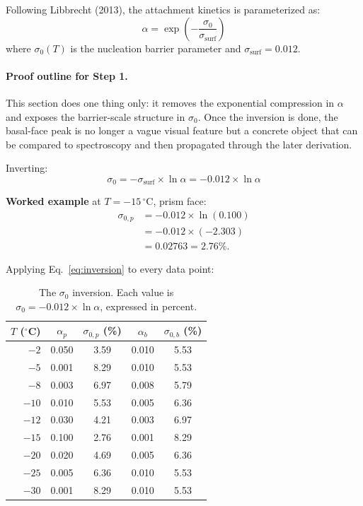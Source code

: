 \documentclass[12pt,letterpaper]{article}
\begin{document}
Following Libbrecht (2013), the attachment kinetics is parameterized as:
\begin{equation}
\alpha = \exp\!\left(-\frac{\sigma_0}{\sigma_{\mathrm{surf}}}\right)
\label{eq:alpha}
\end{equation}
where $\sigma_0(T)$ is the nucleation barrier parameter and $\sigma_{\mathrm{surf}} = 0.012$.

\paragraph{Proof outline for Step 1.}
This section does one thing only: it removes the exponential compression in $\alpha$ and exposes the barrier-scale structure in $\sigma_0$.
Once the inversion is done, the basal-face peak is no longer a vague visual feature but a concrete object that can be compared to spectroscopy and then propagated through the later derivation.

Inverting:
\begin{equation}
\boxed{\sigma_0 = -\sigma_{\mathrm{surf}} \times \ln \alpha = -0.012 \times \ln \alpha}
\label{eq:inversion}
\end{equation}

\textbf{Worked example} at $T = -15\,{}^\circ$C, prism face:
\begin{align}
\sigma_{0,p} &= -0.012 \times \ln(0.100) \\
&= -0.012 \times (-2.303) \\
&= 0.02763 = 2.76\%.
\end{align}

Applying Eq.~\eqref{eq:inversion} to every data point:

\begin{table}[H]
\centering
\caption{The $\sigma_0$ inversion.  Each value is $\sigma_0 = -0.012 \times \ln\alpha$, expressed in percent.}
\label{tab:sigma0}
\begin{tabular}{@{}rcccc@{}}
\toprule
$T$ (${}^\circ$C) & $\alpha_p$ & $\sigma_{0,p}$ (\%) & $\alpha_b$ & $\sigma_{0,b}$ (\%) \\
\midrule
$-2$  & 0.050 & 3.59 & 0.010 & 5.53 \\
$-5$  & 0.001 & 8.29 & 0.010 & 5.53 \\
$-8$  & 0.003 & 6.97 & 0.008 & 5.79 \\
$-10$ & 0.010 & 5.53 & 0.005 & 6.36 \\
$-12$ & 0.030 & 4.21 & 0.003 & 6.97 \\
$-15$ & 0.100 & 2.76 & 0.001 & 8.29 \\
$-20$ & 0.020 & 4.69 & 0.005 & 6.36 \\
$-25$ & 0.005 & 6.36 & 0.010 & 5.53 \\
$-30$ & 0.001 & 8.29 & 0.010 & 5.53 \\
\bottomrule
\end{tabular}
\end{table}
\end{document}
